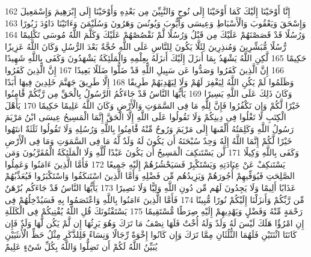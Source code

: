 {\tiny\colorbox{cl_aya}{162}} إِنَّا أَوْحَيْنَا إِلَيْكَ كَمَا أَوْحَيْنَا إِلَى نُوحٍ وَالنَّبِيِّنَ مِن بَعْدِهِ وَأَوْحَيْنَا إِلَى إِبْرَهِيمَ وَإِسْمَعِيلَ وَإِسْحَقَ وَيَعْقُوبَ وَالْأَسْبَاطِ وَعِيسَى وَأَيُّوبَ وَيُونُسَ وَهَرُونَ وَسُلَيْمَنَ وَءَاتَيْنَا دَاوُدَ زَبُورًا
{\tiny\colorbox{cl_aya}{163}} وَرُسُلًا قَدْ قَصَصْنَهُمْ عَلَيْكَ مِن قَبْلُ وَرُسُلًا لَّمْ نَقْصُصْهُمْ عَلَيْكَ وَكَلَّمَ اللَّهُ مُوسَى تَكْلِيمًا
{\tiny\colorbox{cl_aya}{164}} رُّسُلًا مُّبَشِّرِينَ وَمُنذِرِينَ لِئَلَّا يَكُونَ لِلنَّاسِ عَلَى اللَّهِ حُجَّةٌ بَعْدَ الرُّسُلِ وَكَانَ اللَّهُ عَزِيزًا حَكِيمًا
{\tiny\colorbox{cl_aya}{165}} لَّكِنِ اللَّهُ يَشْهَدُ بِمَا أَنزَلَ إِلَيْكَ أَنزَلَهُ بِعِلْمِهِ وَالْمَلَئِكَةُ يَشْهَدُونَ وَكَفَى بِاللَّهِ شَهِيدًا
{\tiny\colorbox{cl_aya}{166}} إِنَّ الَّذِينَ كَفَرُوا وَصَدُّوا عَن سَبِيلِ اللَّهِ قَدْ ضَلُّوا ضَلَلًا بَعِيدًا
{\tiny\colorbox{cl_aya}{167}} إِنَّ الَّذِينَ كَفَرُوا وَظَلَمُوا لَمْ يَكُنِ اللَّهُ لِيَغْفِرَ لَهُمْ وَلَا لِيَهْدِيَهُمْ طَرِيقًا
{\tiny\colorbox{cl_aya}{168}} إِلَّا طَرِيقَ جَهَنَّمَ خَلِدِينَ فِيهَا أَبَدًا وَكَانَ ذَلِكَ عَلَى اللَّهِ يَسِيرًا
{\tiny\colorbox{cl_aya}{169}} يَأَيُّهَا النَّاسُ قَدْ جَاءَكُمُ الرَّسُولُ بِالْحَقِّ مِن رَّبِّكُمْ فََٔامِنُوا خَيْرًا لَّكُمْ وَإِن تَكْفُرُوا فَإِنَّ لِلَّهِ مَا فِى السَّمَوَتِ وَالْأَرْضِ وَكَانَ اللَّهُ عَلِيمًا حَكِيمًا
{\tiny\colorbox{cl_aya}{170}} يَأَهْلَ الْكِتَبِ لَا تَغْلُوا فِى دِينِكُمْ وَلَا تَقُولُوا عَلَى اللَّهِ إِلَّا الْحَقَّ إِنَّمَا الْمَسِيحُ عِيسَى ابْنُ مَرْيَمَ رَسُولُ اللَّهِ وَكَلِمَتُهُ أَلْقَىهَا إِلَى مَرْيَمَ وَرُوحٌ مِّنْهُ فََٔامِنُوا بِاللَّهِ وَرُسُلِهِ وَلَا تَقُولُوا ثَلَثَةٌ انتَهُوا خَيْرًا لَّكُمْ إِنَّمَا اللَّهُ إِلَهٌ وَحِدٌ سُبْحَنَهُ أَن يَكُونَ لَهُ وَلَدٌ لَّهُ مَا فِى السَّمَوَتِ وَمَا فِى الْأَرْضِ وَكَفَى بِاللَّهِ وَكِيلًا
{\tiny\colorbox{cl_aya}{171}} لَّن يَسْتَنكِفَ الْمَسِيحُ أَن يَكُونَ عَبْدًا لِّلَّهِ وَلَا الْمَلَئِكَةُ الْمُقَرَّبُونَ وَمَن يَسْتَنكِفْ عَنْ عِبَادَتِهِ وَيَسْتَكْبِرْ فَسَيَحْشُرُهُمْ إِلَيْهِ جَمِيعًا
{\tiny\colorbox{cl_aya}{172}} فَأَمَّا الَّذِينَ ءَامَنُوا وَعَمِلُوا الصَّلِحَتِ فَيُوَفِّيهِمْ أُجُورَهُمْ وَيَزِيدُهُم مِّن فَضْلِهِ وَأَمَّا الَّذِينَ اسْتَنكَفُوا وَاسْتَكْبَرُوا فَيُعَذِّبُهُمْ عَذَابًا أَلِيمًا وَلَا يَجِدُونَ لَهُم مِّن دُونِ اللَّهِ وَلِيًّا وَلَا نَصِيرًا
{\tiny\colorbox{cl_aya}{173}} يَأَيُّهَا النَّاسُ قَدْ جَاءَكُم بُرْهَنٌ مِّن رَّبِّكُمْ وَأَنزَلْنَا إِلَيْكُمْ نُورًا مُّبِينًا
{\tiny\colorbox{cl_aya}{174}} فَأَمَّا الَّذِينَ ءَامَنُوا بِاللَّهِ وَاعْتَصَمُوا بِهِ فَسَيُدْخِلُهُمْ فِى رَحْمَةٍ مِّنْهُ وَفَضْلٍ وَيَهْدِيهِمْ إِلَيْهِ صِرَطًا مُّسْتَقِيمًا
{\tiny\colorbox{cl_aya}{175}} يَسْتَفْتُونَكَ قُلِ اللَّهُ يُفْتِيكُمْ فِى الْكَلَلَةِ إِنِ امْرُؤٌا هَلَكَ لَيْسَ لَهُ وَلَدٌ وَلَهُ أُخْتٌ فَلَهَا نِصْفُ مَا تَرَكَ وَهُوَ يَرِثُهَا إِن لَّمْ يَكُن لَّهَا وَلَدٌ فَإِن كَانَتَا اثْنَتَيْنِ فَلَهُمَا الثُّلُثَانِ مِمَّا تَرَكَ وَإِن كَانُوا إِخْوَةً رِّجَالًا وَنِسَاءً فَلِلذَّكَرِ مِثْلُ حَظِّ الْأُنثَيَيْنِ يُبَيِّنُ اللَّهُ لَكُمْ أَن تَضِلُّوا وَاللَّهُ بِكُلِّ شَىْءٍ عَلِيمٌ
